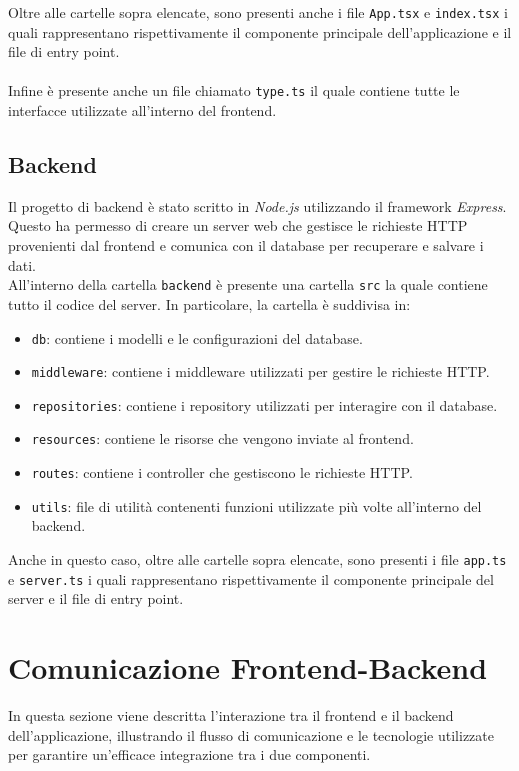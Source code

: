 \documentclass[twoside]{supsistudent}
\begin{document}
Oltre alle cartelle sopra elencate, sono presenti anche i file \texttt{App.tsx} e \texttt{index.tsx} i quali rappresentano rispettivamente il componente principale dell'applicazione e il file di entry point.
\\\\
Infine è presente anche un file chiamato \texttt{type.ts} il quale contiene tutte le interfacce utilizzate all'interno del frontend.

\subsection{Backend}
Il progetto di backend è stato scritto in \textit{Node.js} utilizzando il framework \textit{Express}. Questo ha permesso di creare un server web che gestisce le richieste HTTP provenienti dal frontend e comunica con il database per recuperare e salvare i dati.\\

All'interno della cartella \texttt{backend} è presente una cartella \texttt{src} la quale contiene tutto il codice del server. In particolare, la cartella è suddivisa in:
\begin{itemize}
  \item \texttt{db}: contiene i modelli e le configurazioni del database.
  \item \texttt{middleware}: contiene i middleware utilizzati per gestire le richieste HTTP.
  \item \texttt{repositories}: contiene i repository utilizzati per interagire con il database.
  \item \texttt{resources}: contiene le risorse che vengono inviate al frontend.
  \item \texttt{routes}: contiene i controller che gestiscono le richieste HTTP.
  \item \texttt{utils}: file di utilità contenenti funzioni utilizzate più volte all'interno del backend.
\end{itemize}

Anche in questo caso, oltre alle cartelle sopra elencate, sono presenti i file \texttt{app.ts} e \texttt{server.ts} i quali rappresentano rispettivamente il componente principale del server e il file di entry point.

\section{Comunicazione Frontend-Backend}
In questa sezione viene descritta l'interazione tra il frontend e il backend dell'applicazione, illustrando il flusso di comunicazione e le tecnologie utilizzate per garantire un'efficace integrazione tra i due componenti.
\end{document}
